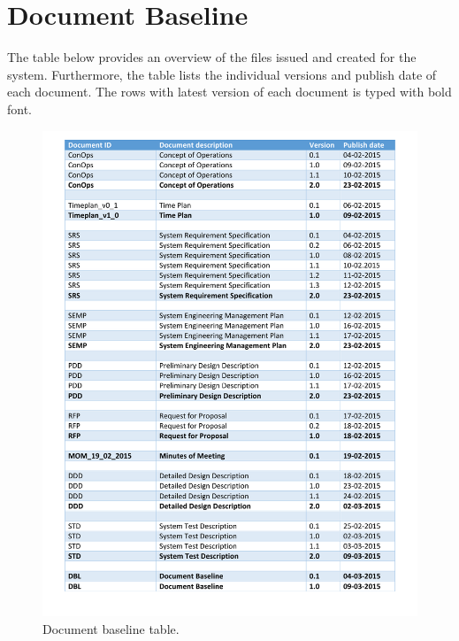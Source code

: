 \chapter{Document Baseline}

The table below provides an overview of the files issued and created for the system. Furthermore, the table lists the individual versions and publish date of each document. The rows with latest version of each document is typed with bold font.

\begin{figure}[H]
\centering
\includegraphics[width=1\textwidth, trim=0mm 15mm 0mm 0mm]
{billeder/document_baseline.pdf}
\caption{Document baseline table.}
\label{fig:dbl_table}
\end{figure}